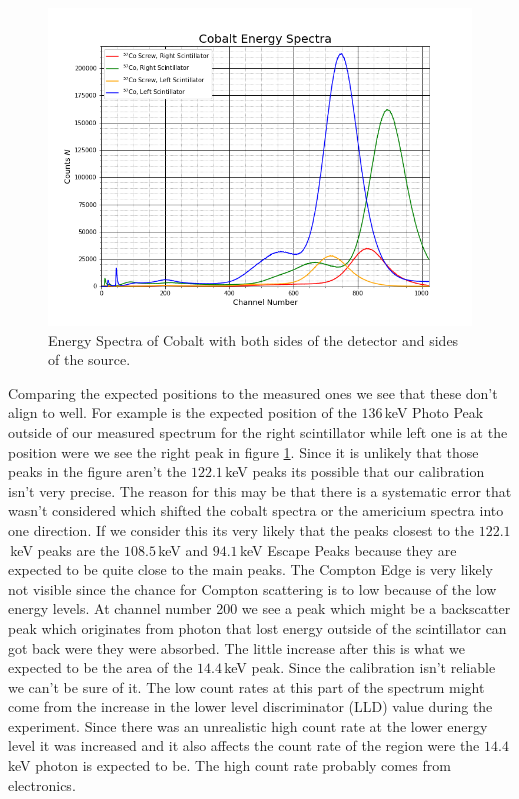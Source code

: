 \documentclass[30pt,a4paper]{article}
\begin{document}
	\begin{figure}[h]
		\includegraphics[scale=0.5]{Bilder/Cobalt_Energy_Spectra1}
		\centering
		\caption[Cobalt Spectrum]{Energy Spectra of Cobalt with both sides of the detector and sides of the source.}
		\label{4cobaltspectra}
	\end{figure}
	Comparing the expected positions to the measured ones we see that these don't align to well. For example is the expected position of the $136\,$keV Photo Peak outside of our measured spectrum for the right scintillator while left one is at the position were we see the right peak in figure \ref{4cobaltspectra}. Since it is unlikely that those peaks in the figure aren't the $122.1$\,keV peaks its possible that our calibration isn't very precise. The reason for this may be that there is a systematic error that wasn't considered which shifted the cobalt spectra or the americium spectra into one direction. If we consider this its very likely that the peaks closest to the $122.1$\,keV peaks are the $108.5\,$keV and $94.1\,$keV Escape Peaks because they are expected to be quite close to the main peaks. The Compton Edge is very likely not visible since the chance for Compton scattering is to low because of the low energy levels. At channel number 200 we see a peak which might be a backscatter peak which originates from photon that lost energy outside of the scintillator can got back were they were absorbed. The little increase after this is what we expected to be the  area of the $14.4\,$keV peak. Since the calibration isn't reliable we can't be sure of it. The low count rates at this part of the spectrum might come from the increase in the lower level discriminator (LLD) value during the experiment. Since there was an unrealistic high count rate at the lower energy level it was increased and it also affects the count rate of the region were the $14.4$\,keV photon is expected to be. The high count rate probably comes from electronics. 
 	\FloatBarrier
\end{document}
